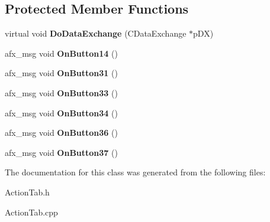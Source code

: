 \subsection*{Protected Member Functions}
\begin{DoxyCompactItemize}
\item 
\hypertarget{class_c_action_tab_ab36298a65c0f4eb7f0212a7e8539828e}{virtual void {\bfseries Do\-Data\-Exchange} (C\-Data\-Exchange $\ast$p\-D\-X)}\label{class_c_action_tab_ab36298a65c0f4eb7f0212a7e8539828e}

\item 
\hypertarget{class_c_action_tab_a7b930bc1d5dc36d05010ed1e34cc3a60}{afx\-\_\-msg void {\bfseries On\-Button14} ()}\label{class_c_action_tab_a7b930bc1d5dc36d05010ed1e34cc3a60}

\item 
\hypertarget{class_c_action_tab_ace3cd104ab4b0c914951d38f2037c96a}{afx\-\_\-msg void {\bfseries On\-Button31} ()}\label{class_c_action_tab_ace3cd104ab4b0c914951d38f2037c96a}

\item 
\hypertarget{class_c_action_tab_a3c749b86789f1ba9625c0c47eb33b565}{afx\-\_\-msg void {\bfseries On\-Button33} ()}\label{class_c_action_tab_a3c749b86789f1ba9625c0c47eb33b565}

\item 
\hypertarget{class_c_action_tab_a83940c91c1309905dd42fa8434f730f4}{afx\-\_\-msg void {\bfseries On\-Button34} ()}\label{class_c_action_tab_a83940c91c1309905dd42fa8434f730f4}

\item 
\hypertarget{class_c_action_tab_a8547d9cd3cc57450b143bcf945dbe352}{afx\-\_\-msg void {\bfseries On\-Button36} ()}\label{class_c_action_tab_a8547d9cd3cc57450b143bcf945dbe352}

\item 
\hypertarget{class_c_action_tab_a09262a9b5aa47df0d0f86d9e09a79fce}{afx\-\_\-msg void {\bfseries On\-Button37} ()}\label{class_c_action_tab_a09262a9b5aa47df0d0f86d9e09a79fce}

\end{DoxyCompactItemize}


The documentation for this class was generated from the following files\-:\begin{DoxyCompactItemize}
\item 
Action\-Tab.\-h\item 
Action\-Tab.\-cpp\end{DoxyCompactItemize}
